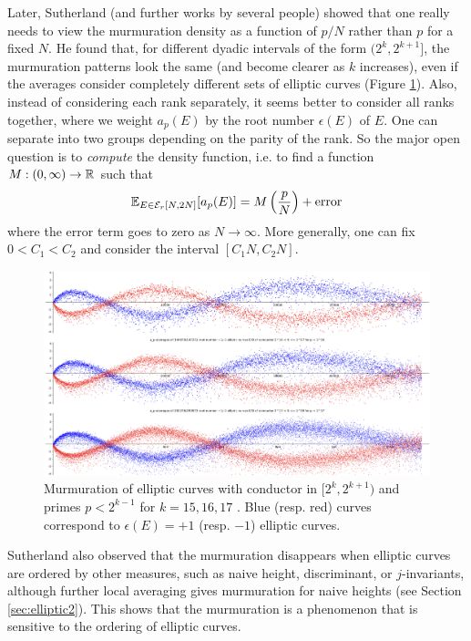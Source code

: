 Later, Sutherland \cite{sutherlandletter} (and further works by several people) showed that one really needs to view the murmuration density as a function of $p / N$ rather than $p$ for a fixed $N$.
He found that, for different dyadic intervals of the form $(2^k, 2^{k+1}]$, the murmuration patterns look the same (and become clearer as $k$ increases), even if the averages consider completely different sets of elliptic curves (Figure \ref{fig:sutherland_elliptic_dyadic}).
Also, instead of considering each rank separately, it seems better to consider all ranks together, where we weight $a_p(E)$ by the root number $\epsilon(E)$ of $E$.
One can separate into two groups depending on the parity of the rank.
So the major open question is to \emph{compute} the density function, i.e. to find a function $M: (0, \infty) \to \mathbb{R}$ such that
\begin{equation}
    \mathbb{E}_{E \in \mathcal{E}_r[N, 2N]} [a_p(E)] = M\left(\frac{p}{N}\right) + \text{error}
\end{equation}
where the error term goes to zero as $N \to \infty$. More generally, one can fix $0 < C_1 < C_2$ and consider the interval $[C_1 N, C_2 N]$.

\begin{figure}[htp] 
    \includegraphics[width=\textwidth]{src/sutherland.png}%
    \caption{Murmuration of elliptic curves with conductor in $[2^{k}, 2^{k+1})$ and primes $p < 2^{k-1}$ for $k = 15, 16, 17$ \cite{sutherlandletter}. Blue (resp. red) curves correspond to $\epsilon(E) = +1$ (resp. $-1$) elliptic curves.}
\label{fig:sutherland_elliptic_dyadic}
\end{figure}


Sutherland also observed that the murmuration disappears when elliptic curves are ordered by other measures, such as naive height, discriminant, or $j$-invariants, although further local averaging gives murmuration for naive heights (see Section \ref{sec:elliptic2}).
This shows that the murmuration is a phenomenon that is sensitive to the ordering of elliptic curves.


